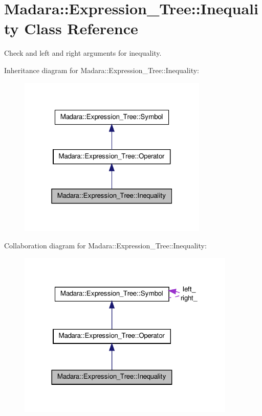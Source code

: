 \hypertarget{classMadara_1_1Expression__Tree_1_1Inequality}{
\section{Madara::Expression\_\-Tree::Inequality Class Reference}
\label{d8/dfe/classMadara_1_1Expression__Tree_1_1Inequality}
}


Check and left and right arguments for inequality.  




Inheritance diagram for Madara::Expression\_\-Tree::Inequality:
\nopagebreak
\begin{figure}[H]
\begin{center}
\leavevmode
\includegraphics[width=256pt]{dc/dba/classMadara_1_1Expression__Tree_1_1Inequality__inherit__graph}
\end{center}
\end{figure}


Collaboration diagram for Madara::Expression\_\-Tree::Inequality:
\nopagebreak
\begin{figure}[H]
\begin{center}
\leavevmode
\includegraphics[width=294pt]{da/d6b/classMadara_1_1Expression__Tree_1_1Inequality__coll__graph}
\end{center}
\end{figure}
